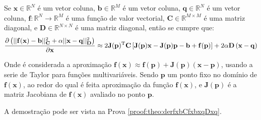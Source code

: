 \begin{theorem}\label{theo:derfxbCfxbxqDxq}
Se 
$\mathbf{x}\in \mathbb{R}^N$ é um vetor coluna, 
$\mathbf{b}\in \mathbb{R}^M$ é um vetor coluna,
$\mathbf{q}\in \mathbb{R}^N$ é um vetor coluna, 
$\mathbf{f}: \mathbb{R}^{N}\rightarrow \mathbb{R}^{M}$ é uma função de valor vectorial, 
$\mathbf{C} \in \mathbb{R}^{M\times M}$ é uma matriz diagonal, e
$\mathbf{D} \in \mathbb{R}^{N\times N}$ é uma matriz diagonal, 
então se cumpre que:
\begin{equation}
\frac{\partial \left(||\mathbf{f}(\mathbf{x})-\mathbf{b}||_{\mathbf{C}}^2+\alpha||\mathbf{x}-\mathbf{q}||_{\mathbf{D}}^2\right)}{\partial \mathbf{x}} \approx
2 \mathbf{J}(\mathbf{p})^{\mathrm{T}}\mathbf{C}\left[\mathbf{J}(\mathbf{p})\mathbf{x} - \mathbf{J}(\mathbf{p})\mathbf{p}-\mathbf{b}+\mathbf{f}(\mathbf{p})\right]
+2\alpha\mathbf{D}\left(\mathbf{x}-\mathbf{q}\right)
\end{equation}

Onde é considerada a aproximação
$\mathbf{f}(\mathbf{x})\approx \mathbf{f}(\mathbf{p})+\mathbf{J}(\mathbf{p})\left(\mathbf{x}-\mathbf{p}\right)$,
usando a serie de Taylor para funções multivariáveis. Sendo $\mathbf{p}$ um ponto fixo no domínio de $\mathbf{f}(\mathbf{x})$,  ao redor do qual é feita  aproximação
da função $\mathbf{f}(\mathbf{x})$,
e $\mathbf{J}(\mathbf{p})$ é a matriz Jacobiana de $\mathbf{f}(\mathbf{x})$ avaliado no ponto $\mathbf{p}$.

A demostração pode ser vista na Prova \ref{proof:theo:derfxbCfxbxqDxq}.
\end{theorem}

